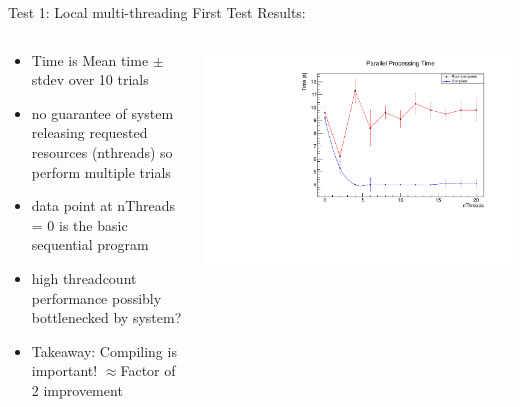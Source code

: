 \documentclass[10pt]{beamer}
\begin{document}
\begin{frame}{Test 1: Local multi-threading}
First Test Results:\\
\begin{columns}
	\begin{column}{0.5\textwidth}
	\begin{itemize}
		\scriptsize
		\item Time is Mean time $\pm$ stdev over 10 trials
		\item no guarantee of system releasing requested resources (nthreads) so perform multiple trials
		\item data point at nThreads = 0 is the basic sequential program
		\item high threadcount performance possibly bottlenecked by system?
		\item Takeaway: Compiling is important! $\approx $Factor of 2 improvement
	\end{itemize}
	\end{column}
	\begin{column}{0.5\textwidth}
   		\includegraphics[scale=0.3, left]{../ParTree/test1plot.pdf}

	\end{column}
\end{columns}
\end{frame}
\end{document}
